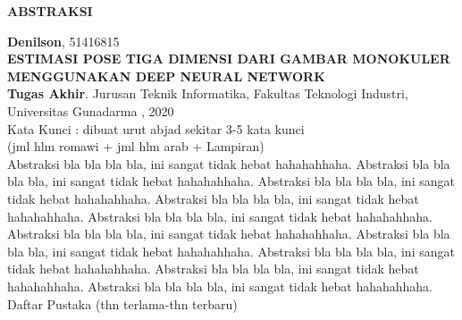 \newpage %
\begin{center}
\begin{large}\textbf{ABSTRAKSI}\end{large}
\end{center}

\vspace{5mm} 

\noindent \textbf{Denilson}, 51416815 \\
\textbf{ESTIMASI POSE TIGA DIMENSI DARI GAMBAR MONOKULER}\\
\textbf{MENGGUNAKAN DEEP NEURAL NETWORK} \\
\textbf{Tugas Akhir}. Jurusan Teknik Informatika, Fakultas Teknologi Industri, \\
Universitas Gunadarma , 2020\\
Kata Kunci : dibuat urut abjad sekitar 3-5 kata kunci\\
\noindent (jml hlm romawi + jml hlm arab + Lampiran)\\

Abstraksi bla bla bla bla, ini sangat tidak hebat hahahahhaha.
Abstraksi bla bla bla bla, ini sangat tidak hebat hahahahhaha.
Abstraksi bla bla bla bla, ini sangat tidak hebat hahahahhaha.
Abstraksi bla bla bla bla, ini sangat tidak hebat hahahahhaha.
Abstraksi bla bla bla bla, ini sangat tidak hebat hahahahhaha.
Abstraksi bla bla bla bla, ini sangat tidak hebat hahahahhaha.
Abstraksi bla bla bla bla, ini sangat tidak hebat hahahahhaha.
Abstraksi bla bla bla bla, ini sangat tidak hebat hahahahhaha.
Abstraksi bla bla bla bla, ini sangat tidak hebat hahahahhaha.
Abstraksi bla bla bla bla, ini sangat tidak hebat hahahahhaha.\\

\noindent Daftar Pustaka (thn terlama-thn terbaru)
